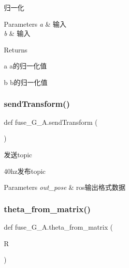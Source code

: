 归一化 


\begin{DoxyParams}{Parameters}
{\em a} & 输入 \\
\hline
{\em b} & 输入\\
\hline
\end{DoxyParams}
\begin{DoxyReturn}{Returns}


a a的归一化值 

b b的归一化值 
\end{DoxyReturn}
\mbox{\label{namespacefuse___g___a_a6d74da897ef71d656b91058602147dd2}} 
\subsubsection{\texorpdfstring{send\+Transform()}{sendTransform()}}
{\footnotesize\ttfamily def fuse\+\_\+\+G\+\_\+\+A.\+send\+Transform (\begin{DoxyParamCaption}{ }\end{DoxyParamCaption})}



发送topic 

40hz发布topic


\begin{DoxyParams}{Parameters}
{\em out\+\_\+pose} & ros输出格式数据 \\
\hline
\end{DoxyParams}
\mbox{\label{namespacefuse___g___a_aabfeca3b897b1b53700aeb3d5a2b7f74}} 
\subsubsection{\texorpdfstring{theta\+\_\+from\+\_\+matrix()}{theta\_from\_matrix()}}
{\footnotesize\ttfamily def fuse\+\_\+\+G\+\_\+\+A.\+theta\+\_\+from\+\_\+matrix (\begin{DoxyParamCaption}\item[{}]{R }\end{DoxyParamCaption})}



